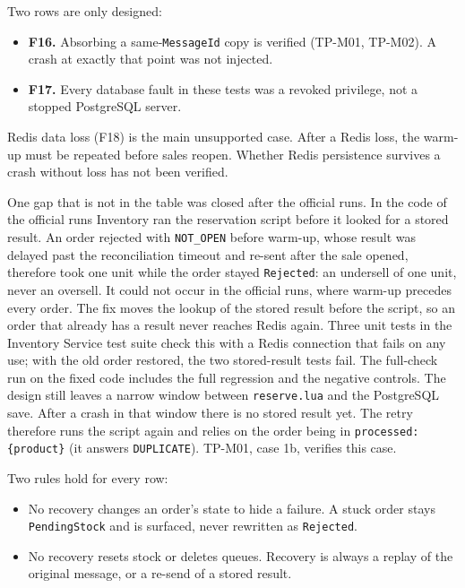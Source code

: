 \documentclass[a4paper]{report}
\begin{document}
Two rows are only designed:
\begin{itemize}
  \item \textbf{F16.} Absorbing a same-\texttt{MessageId} copy is verified
    (TP-M01, TP-M02). A crash at exactly that point was not injected.
  \item \textbf{F17.} Every database fault in these tests was a revoked
    privilege, not a stopped PostgreSQL server.
\end{itemize}

Redis data loss (F18) is the main unsupported case. After a Redis loss, the
warm-up must be repeated before sales reopen. Whether Redis
persistence survives a crash without loss has not been verified.

One gap that is not in the table was closed after the official runs. In
the code of the official runs Inventory ran the reservation script before it
looked for a stored result. An order rejected with \texttt{NOT\_OPEN} before
warm-up, whose result was delayed past the reconciliation timeout and re-sent
after the sale opened, therefore took one unit while the order stayed
\texttt{Rejected}: an undersell of one unit, never an oversell. It could not
occur in the official runs, where warm-up precedes every order. The fix
moves the lookup of the stored result before the script, so
an order that already has a result never reaches Redis again. Three unit tests
in the Inventory Service test suite check this with a Redis
connection that fails on any use; with the old order restored, the two
stored-result tests fail. The full-check run on the fixed code includes the
full regression and the negative controls. The design still leaves a narrow
window between \texttt{reserve.lua} and the
PostgreSQL save. After a crash in that window there is no stored result yet.
The retry therefore runs the script again and relies on the order being in
\texttt{processed:\{product\}} (it answers \texttt{DUPLICATE}). TP-M01, case
1b, verifies this case.

Two rules hold for every row:
\begin{itemize}
  \item No recovery changes an order's state to hide a failure. A stuck order
    stays \texttt{PendingStock} and is surfaced, never rewritten as
    \texttt{Rejected}.
  \item No recovery resets stock or deletes queues. Recovery is always a
    replay of the original message, or a re-send of a stored result.
\end{itemize}
\end{document}
